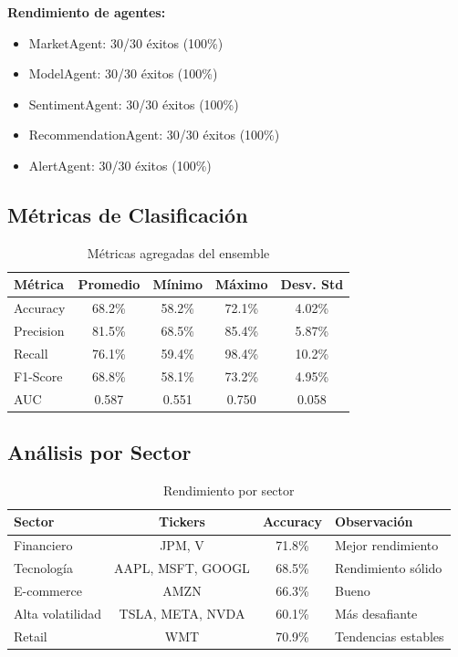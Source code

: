 \documentclass[12pt,a4paper]{article}
\begin{document}
\textbf{Rendimiento de agentes:}
\begin{itemize}
    \item MarketAgent: 30/30 éxitos (100\%)
    \item ModelAgent: 30/30 éxitos (100\%)
    \item SentimentAgent: 30/30 éxitos (100\%)
    \item RecommendationAgent: 30/30 éxitos (100\%)
    \item AlertAgent: 30/30 éxitos (100\%)
\end{itemize}

\subsection{Métricas de Clasificación}

\begin{table}[H]
\centering
\begin{tabular}{lcccc}
\toprule
\textbf{Métrica} & \textbf{Promedio} & \textbf{Mínimo} & \textbf{Máximo} & \textbf{Desv. Std} \\
\midrule
Accuracy & 68.2\% & 58.2\% & 72.1\% & 4.02\% \\
Precision & 81.5\% & 68.5\% & 85.4\% & 5.87\% \\
Recall & 76.1\% & 59.4\% & 98.4\% & 10.2\% \\
F1-Score & 68.8\% & 58.1\% & 73.2\% & 4.95\% \\
AUC & 0.587 & 0.551 & 0.750 & 0.058 \\
\bottomrule
\end{tabular}
\caption{Métricas agregadas del ensemble}
\end{table}

\subsection{Análisis por Sector}

\begin{table}[H]
\centering
\begin{tabular}{lccp{5cm}}
\toprule
\textbf{Sector} & \textbf{Tickers} & \textbf{Accuracy} & \textbf{Observación} \\
\midrule
Financiero & JPM, V & 71.8\% & Mejor rendimiento \\
Tecnología & AAPL, MSFT, GOOGL & 68.5\% & Rendimiento sólido \\
E-commerce & AMZN & 66.3\% & Bueno \\
Alta volatilidad & TSLA, META, NVDA & 60.1\% & Más desafiante \\
Retail & WMT & 70.9\% & Tendencias estables \\
\bottomrule
\end{tabular}
\caption{Rendimiento por sector}
\end{table}
\end{document}
